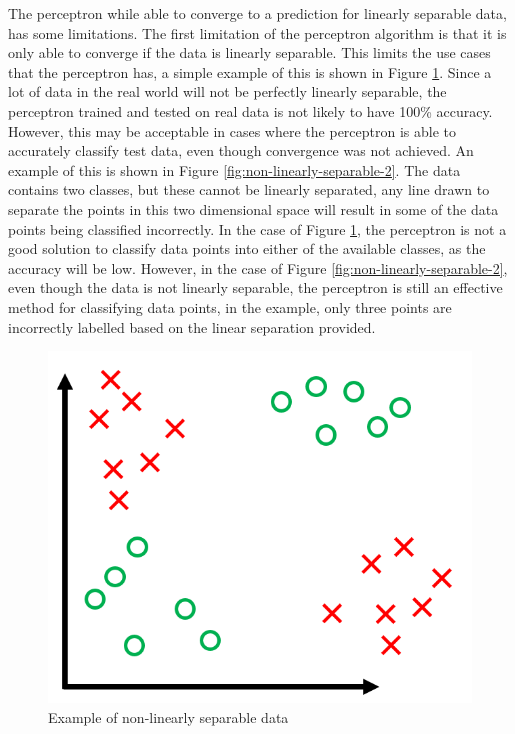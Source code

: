 \documentclass[10pt,twocolumn,a4paper]{article}
\begin{document}
The perceptron while able to converge to a prediction for linearly separable data, has some limitations. The first limitation of the perceptron algorithm is that it is only able to converge if the data is linearly separable. This limits the use cases that the perceptron has, a simple example of this is shown in Figure \ref{fig:non-linearly-separable}. Since a lot of data in the real world will not be perfectly linearly separable, the perceptron trained and tested on real data is not likely to have 100\% accuracy. However, this may be acceptable in cases where the perceptron is able to accurately classify test data, even though convergence was not achieved. An example of this is shown in Figure \ref{fig:non-linearly-separable-2}. The data contains two classes, but these cannot be linearly separated, any line drawn to separate the points in this two dimensional space will result in some of the data points being classified incorrectly. In the case of Figure \ref{fig:non-linearly-separable}, the perceptron is not a good solution to classify data points into either of the available classes, as the accuracy will be low. However, in the case of Figure \ref{fig:non-linearly-separable-2}, even though the data is not linearly separable, the perceptron is still an effective method for classifying data points, in the example, only three points are incorrectly labelled based on the linear separation provided.

\begin{figure}
    \centering
    \includegraphics[width=1\linewidth]{non-linearly-separable.png}
    \caption{Example of non-linearly separable data}
    \label{fig:non-linearly-separable}
\end{figure}
\end{document}
